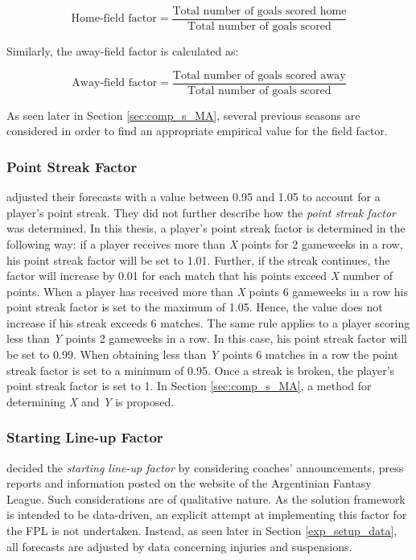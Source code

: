 \begin{equation*}
    \textrm{Home-field factor} = \frac{\textrm{Total number of goals scored home}}{\textrm{Total number of goals scored}} 
\end{equation*}

Similarly, the away-field factor is calculated as:

\begin{equation*}
    \textrm{Away-field factor} = \frac{\textrm{Total number of goals scored away}}{\textrm{Total number of goals scored}}
\end{equation*}

As seen later in Section \ref{sec:comp_s_MA}, several previous seasons are considered in order to find an appropriate empirical value for the field factor.


\subsubsection{Point Streak Factor}

\cite{Bonomo} adjusted their forecasts with a value between 0.95 and 1.05 to account for a player's point streak. They did not further describe how the \textit{point streak factor} was determined. In this thesis, a player's point streak factor is determined in the following way: if a player receives more than \textit{X} points for 2 gameweeks in a row, his point streak factor will be set to 1.01. Further, if the streak continues, the factor will increase by 0.01 for each match that his points exceed \textit{X} number of points. When a player has received more than \textit{X} points 6 gameweeks in a row his point streak factor is set to the maximum of 1.05. Hence, the value does not increase if his streak exceeds 6 matches. The same rule applies to a player scoring less than \textit{Y} points 2 gameweeks in a row. In this case, his point streak factor will be set to 0.99. When obtaining less than \textit{Y} points 6 matches in a row the point streak factor is set to a minimum of 0.95. Once a streak is broken, the player's point streak factor is set to 1. In Section \ref{sec:comp_s_MA}, a method for determining \textit{X} and \textit{Y} is proposed.

\subsubsection{Starting Line-up Factor}

\cite{Bonomo} decided the \textit{starting line-up factor} by considering coaches' announcements, press reports and information posted on the website of the Argentinian Fantasy League. Such considerations are of qualitative nature. As the solution framework is intended to be data-driven, an explicit attempt at implementing this factor for the FPL is not undertaken. Instead, as seen later in Section \ref{exp_setup_data}, all forecasts are adjusted by data concerning injuries and suspensions.

